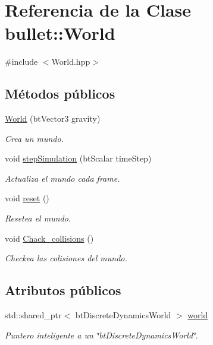 \hypertarget{classbullet_1_1_world}{}\section{Referencia de la Clase bullet\+::World}
\label{classbullet_1_1_world}


{\ttfamily \#include $<$World.\+hpp$>$}

\subsection*{Métodos públicos}
\begin{DoxyCompactItemize}
\item 
\mbox{\hyperlink{classbullet_1_1_world_a1f66a0de2a5e68b6ab60798f6079a717}{World}} (bt\+Vector3 gravity)
\begin{DoxyCompactList}\small\item\em Crea un mundo. \end{DoxyCompactList}\item 
void \mbox{\hyperlink{classbullet_1_1_world_af44424b7aa06ece6f466db7b46a2ec62}{step\+Simulation}} (bt\+Scalar time\+Step)
\begin{DoxyCompactList}\small\item\em Actualiza el mundo cada frame. \end{DoxyCompactList}\item 
void \mbox{\hyperlink{classbullet_1_1_world_a9ea86b3faa211bac0cc1f8beec534672}{reset}} ()
\begin{DoxyCompactList}\small\item\em Resetea el mundo. \end{DoxyCompactList}\item 
void \mbox{\hyperlink{classbullet_1_1_world_af2b049dee491b5f571adf4d636602e8b}{Chack\+\_\+collisions}} ()
\begin{DoxyCompactList}\small\item\em Checkea las colisiones del mundo. \end{DoxyCompactList}\end{DoxyCompactItemize}
\subsection*{Atributos públicos}
\begin{DoxyCompactItemize}
\item 
std\+::shared\+\_\+ptr$<$ bt\+Discrete\+Dynamics\+World $>$ \mbox{\hyperlink{classbullet_1_1_world_acae0ff3a821fe6e921f9bcaee6021875}{world}}
\begin{DoxyCompactList}\small\item\em Puntero inteligente a un \char`\"{}bt\+Discrete\+Dynamics\+World\char`\"{}. \end{DoxyCompactList}\end{DoxyCompactItemize}


